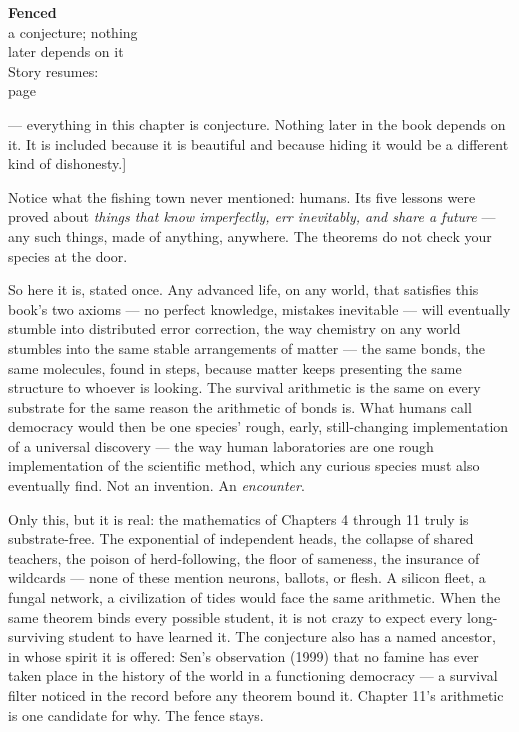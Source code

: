 
\begin{fenced}{\textbf{Fenced}\\a conjecture; nothing\\later depends on it\\[3pt]{\color{muted}Story resumes:\\page~\pageref{partV}}}


\noindent {[} --- everything in this chapter is conjecture. Nothing later
in the book depends on it. It is included because it is beautiful and
because hiding it would be a different kind of dishonesty.{]}

Notice what the fishing town never mentioned: humans. Its five lessons
were proved about \emph{things that know imperfectly, err inevitably, and
share a future} --- any such things, made of anything, anywhere. The
theorems do not check your species at the door.


So here it is, stated once. Any advanced life, on any world, that
satisfies this book's two axioms --- no perfect knowledge, mistakes
inevitable --- will eventually stumble into distributed error
correction, the way chemistry on any world stumbles into the same
stable arrangements of matter --- the same bonds, the same molecules,
found in steps, because matter keeps presenting the same structure to
whoever is looking. The survival arithmetic is the same on every
substrate for the same reason the arithmetic of bonds is. What humans call democracy
would then be one species' rough, early, still-changing implementation
of a universal discovery --- the way human laboratories are one rough
implementation of the scientific method, which any curious species
must also eventually find. Not an invention. An \emph{encounter}.


Only this, but it is real: the mathematics of Chapters 4 through 11
truly is substrate-free. The exponential of independent heads, the
collapse of shared teachers, the poison of herd-following, the floor
of sameness, the insurance of wildcards --- none of these mention
neurons, ballots, or flesh. A silicon fleet, a fungal network, a
civilization of tides would face the same arithmetic. When the same
theorem binds every possible student, it is not crazy to expect every
long-surviving student to have learned it. The conjecture also has a named ancestor, in whose spirit it is offered: Sen's observation (1999) that no famine has ever taken place in the history of the world in a functioning democracy --- a survival filter noticed in the record before any theorem bound it. Chapter 11's arithmetic is one candidate for why. The fence stays.


\end{fenced}
